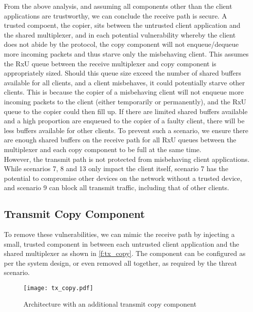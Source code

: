 From the above analysis, and assuming all components other than the client applications are trustworthy,
we can conclude the receive path is secure. A trusted compoent, the copier, sits between the untrusted client application
and the shared multiplexer, and in each potential vulnerability whereby the client does not abide by the protocol, the copy component
will not enqueue/dequeue more incoming packets and thus starve only the misbehaving client. This assumes the RxU queue between 
the receive multiplexer and copy component is appropriately sized. Should this queue size exceed the number of shared buffers
available for all clients, and a client misbehaves, it could potentially starve other clients. This is because the copier
of a misbehaving client will not enqueue more incoming packets to the client (either temporarily or permanently), and the RxU queue
to the copier could then fill up. If there are limited shared buffers available and a high proportion are enqueued to the copier
of a faulty client, there will be less buffers available for other clients. To prevent such a scenario, we ensure there are enough
shared buffers on the receive path for all RxU queues between the multiplexer and each copy component to be full at the same time.\\

However, the transmit path is not protected from misbehaving client applications. While scenarios 7, 8 and 13 only impact the client
itself, scenario 7 has the potential to compromise other devices on the network without a trusted device, and scenario 9 can block
all transmit traffic, including that of other clients.\\

\subsection{Transmit Copy Component}

To remove these vulnerabilities, we can mimic the receive path by injecting a small, trusted component in between each untrusted
client application and the shared multiplexer as shown in \autoref{f:tx_copy}. The component can be configured as
per the system design, or even removed all together, as required by the threat scenario.

\begin{figure}[h]
    \centering
    \texttt{[image: tx\_copy.pdf]}
    \caption{Architecture with an additional transmit copy component}
    \label{f:tx_copy}
\end{figure}


